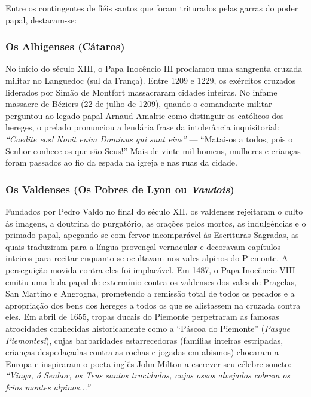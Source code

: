 Entre os contingentes de fiéis santos que foram triturados pelas garras do poder papal, destacam-se:


\subsubsection*{Os Albigenses (Cátaros)}
No início do século XIII, o Papa Inocêncio III proclamou uma sangrenta cruzada militar no Languedoc (sul da França). Entre 1209 e 1229, os exércitos cruzados liderados por Simão de Montfort massacraram cidades inteiras. No infame massacre de Béziers (22 de julho de 1209), quando o comandante militar perguntou ao legado papal Arnaud Amalric como distinguir os católicos dos hereges, o prelado pronunciou a lendária frase da intolerância inquisitorial: \textit{``Caedite eos! Novit enim Dominus qui sunt eius''} — ``Matai-os a todos, pois o Senhor conhece os que são Seus!'' Mais de vinte mil homens, mulheres e crianças foram passados ao fio da espada na igreja e nas ruas da cidade.


\subsubsection*{Os Valdenses (Os Pobres de Lyon ou \textit{Vaudois})}
Fundados por Pedro Valdo no final do século XII, os valdenses rejeitaram o culto às imagens, a doutrina do purgatório, as orações pelos mortos, as indulgências e o primado papal, apegando-se com fervor incomparável às Escrituras Sagradas, as quais traduziram para a língua provençal vernacular e decoravam capítulos inteiros para recitar enquanto se ocultavam nos vales alpinos do Piemonte. A perseguição movida contra eles foi implacável. Em 1487, o Papa Inocêncio VIII emitiu uma bula papal de extermínio contra os valdenses dos vales de Pragelas, San Martino e Angrogna, prometendo a remissão total de todos os pecados e a apropriação dos bens dos hereges a todos os que se alistassem na cruzada contra eles. Em abril de 1655, tropas ducais do Piemonte perpetraram as famosas atrocidades conhecidas historicamente como a ``Páscoa do Piemonte'' (\textit{Pasque Piemontesi}), cujas barbaridades estarrecedoras (famílias inteiras estripadas, crianças despedaçadas contra as rochas e jogadas em abismos) chocaram a Europa e inspiraram o poeta inglês John Milton a escrever seu célebre soneto: \textit{``Vinga, ó Senhor, os Teus santos trucidados, cujos ossos alvejados cobrem os frios montes alpinos...''}


